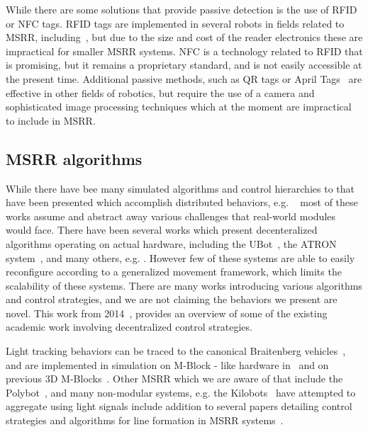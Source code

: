 While there are some solutions that provide passive detection is the use of RFID or NFC tags. RFID tags are implemented in several robots in fields related to MSRR, including~\cite{werfel2006distributed}, but due to the size and cost of the reader electronics these are impractical for smaller MSRR systems. NFC is a technology related to RFID that is promising, but it remains a proprietary standard, and is not easily accessible at the present time. Additional passive methods, such as QR tags or April Tags~\cite{wang2016iros} are effective in other fields of robotics, but require the use of a camera and sophisticated image processing techniques which at the moment are impractical to include in MSRR.

\subsection{MSRR algorithms}
\label{ssec:RW-Algorithmic}
While there have bee many simulated algorithms and control hierarchies to that have been presented which accomplish distributed behaviors, e.g. ~\cite{Jones-ICRA03, butler2002generic, stoy-747simulation-2004} most of these works assume and abstract away various challenges that real-world modules would face. There have been several works which present decenteralized algorithms operating on actual hardware, including the UBot~\cite{zhu2015simplified}, the ATRON system~\cite{christensen2013distributed}, and many others, e.g. \cite{germanswarm-Levi-2014, Yim-IROS07}. However few of these systems are able to easily reconfigure according to a generalized movement framework, which limits the scalability of these systems. There are many works introducing various algorithms and control strategies, and we are not claiming the behaviors we present are novel. This work from 2014~\cite{abukhalil2013survey}, provides an overview of some of the existing academic work involving decentralized control strategies.

Light tracking behaviors can be traced to the canonical Braitenberg vehicles~\cite{braitenberg1986vehicles}, and are implemented in simulation on M-Block - like hardware in~\cite{sclaicithesis2016} and on previous 3D M-Blocks~\cite{claici2017distributed}. Other MSRR which we are aware of that include the Polybot~\cite{Yim-IROS07}, and many non-modular systems, e.g. the Kilobots~\cite{Rubenstein-ICRA12} have attempted to aggregate using light signals include addition to several papers detailing control strategies and algorithms for line formation in MSRR systems~\cite{claici2017distributed, sclaicithesis2016}.


